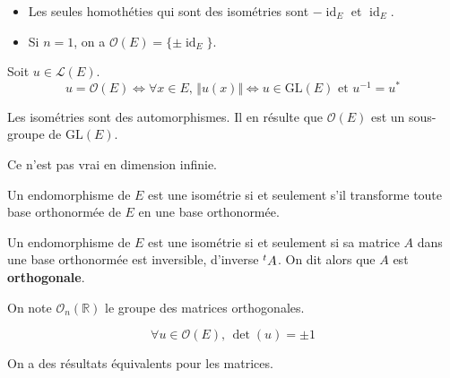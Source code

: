  \begin{example}
    \begin{itemize}
      \item Les seules homothéties qui sont des isométries sont $-\operatorname{id}_E$ et $\operatorname{id}_E$.
      \item Si $n = 1$, on a $\mathcal{O}(E) = \{ \pm \operatorname{id}_E \}$.
    \end{itemize}
  \end{example}


  \begin{proposition}
    Soit $u \in \mathcal{L}(E)$.
    \[ u = \mathcal{O}(E) \iff \forall x \in E, \, \Vert u(x) \Vert \iff u \in \mathrm{GL}(E) \text{ et } u^{-1} = u^* \]
  \end{proposition}


  \begin{theorem}
    Les isométries sont des automorphismes. Il en résulte que $\mathcal{O}(E)$ est un sous-groupe de $\mathrm{GL}(E)$.
  \end{theorem}

  \begin{remark}
    Ce n'est pas vrai en dimension infinie.
  \end{remark}

  \begin{theorem}
    Un endomorphisme de $E$ est une isométrie si et seulement s'il transforme toute base orthonormée de $E$ en une base orthonormée.
  \end{theorem}

  \begin{theorem}
    Un endomorphisme de $E$ est une isométrie si et seulement si sa matrice $A$ dans une base orthonormée est inversible, d'inverse $\mathstrut ^t A$.
    \newpar
    On dit alors que $A$ est \textbf{orthogonale}.
  \end{theorem}

  \begin{notation}
    On note $\mathcal{O}_n(\mathbb{R})$ le groupe des matrices orthogonales.
  \end{notation}

  \begin{theorem}
    \[ \forall u \in \mathcal{O}(E), \, \det(u) = \pm 1 \]
  \end{theorem}

  \begin{remark}
    On a des résultats équivalents pour les matrices.
  \end{remark}

